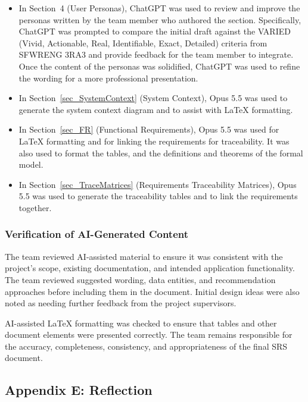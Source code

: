 \documentclass[12pt]{article}
\begin{document}
\begin{itemize}
    \item In Section~4 (User Personas), ChatGPT was used to review and
    improve the personas written by the team member who authored the section.
    Specifically, ChatGPT was prompted to compare the initial draft against
    the VARIED (Vivid, Actionable, Real, Identifiable, Exact, Detailed) criteria
    from SFWRENG 3RA3 and provide feedback for the team member to integrate.
    Once the content of the personas was solidified, ChatGPT was used to
    refine the wording for a more professional presentation.
    \item In Section~\ref{sec_SystemContext} (System Context), Opus 5.5 was
    used to generate the system context diagram and to assist with \LaTeX{}
    formatting.

    \item In Section~\ref{sec_FR} (Functional Requirements), Opus 5.5 was used
    for \LaTeX{} formatting and for linking the requirements for traceability.
    It was also used to format the tables, and the definitions and theorems
    of the formal model.

    \item In Section~\ref{sec_TraceMatrices} (Requirements Traceability
    Matrices), Opus 5.5 was used to generate the traceability tables and to
    link the requirements together.
\end{itemize}

\subsubsection*{Verification of AI-Generated Content}

The team reviewed AI-assisted material to ensure it was
consistent with the project's scope, existing documentation,
and intended application functionality. The team reviewed suggested 
wording, data entities, and recommendation approaches before including 
them in the document. Initial design ideas were also noted as needing 
further feedback from the project supervisors.

AI-assisted \LaTeX{} formatting was checked to ensure
that tables and other document elements were presented
correctly. The team remains responsible for the accuracy,
completeness, consistency, and appropriateness of the
final SRS document.

\subsection{Appendix E: Reflection}
\end{document}
